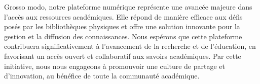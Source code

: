 Grosso modo, notre plateforme numérique représente une avancée majeure dans l'accès aux ressources académiques. Elle répond de manière efficace aux défis posés par les bibliothèques physiques et offre une solution innovante pour la gestion et la diffusion des connaissances. Nous espérons que cette plateforme contribuera significativement à l'avancement de la recherche et de l'éducation, en favorisant un accès ouvert et collaboratif aux savoirs académiques. Par cette initiative, nous nous engageons à promouvoir une culture de partage et d'innovation, au bénéfice de toute la communauté académique.\par


